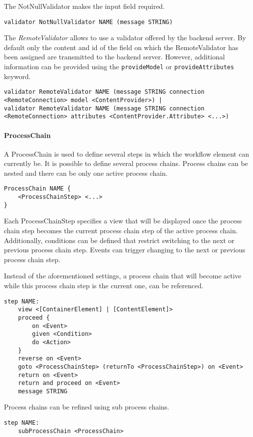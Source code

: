 The NotNullValidator makes the input field required.
\begin{lstlisting}
validator NotNullValidator NAME (message STRING)
\end{lstlisting}

The \textit{RemoteValidator} allows to use a validator offered by the backend server. By default only the content and id of the field on which the RemoteValidator has been assigned are transmitted to the backend server. However, additional information can be provided using the \lstinline!provideModel! or
\lstinline!provideAttributes! keyword.
\begin{lstlisting}
validator RemoteValidator NAME (message STRING connection <RemoteConnection> model <ContentProvider>) |
validator RemoteValidator NAME (message STRING connection <RemoteConnection> attributes <ContentProvider.Attribute> <...>)
\end{lstlisting}

\paragraph{ProcessChain}
\label{sec:processChain}
A ProcessChain is used to define several steps in which the workflow element can currently be. It is possible to define several process chains. Process chains can be nested and there can be only one active process chain.
\begin{lstlisting}
ProcessChain NAME {
	<ProcessChainStep> <...>
}
\end{lstlisting}

Each ProcessChainStep specifies a view that will be displayed once the process chain step becomes the current process chain step of the active process chain. Additionally, conditions can be defined that restrict switching to the next or previous process chain step. Events can trigger changing to the next or previous process chain step.
 
Instead of the aforementioned settings, a process chain that will become active while this process chain step is the current one, can be referenced.
\begin{lstlisting}
step NAME:
	view <[ContainerElement] | [ContentElement]>
	proceed {
		on <Event>
		given <Condition>
		do <Action>
	}
	reverse on <Event>
	goto <ProcessChainStep> (returnTo <ProcessChainStep>) on <Event>
	return on <Event>
	return and proceed on <Event>
	message STRING
\end{lstlisting}

Process chains can be refined using sub process chains.
\begin{lstlisting}
step NAME:
	subProcessChain <ProcessChain>
\end{lstlisting}

